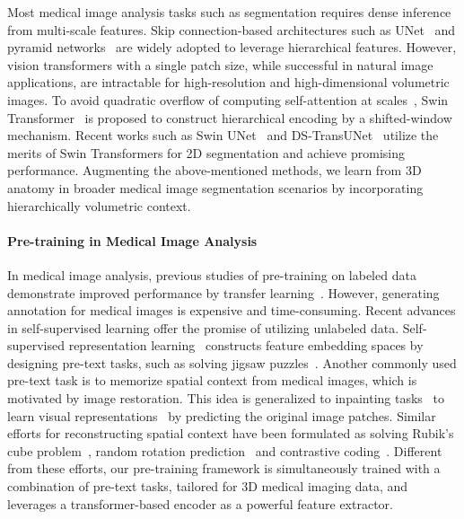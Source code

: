 \documentclass[10pt,twocolumn,letterpaper]{article}
\begin{document}
Most medical image analysis tasks such as segmentation requires dense inference from multi-scale features. Skip connection-based architectures such as UNet~\cite{cciccek20163d} and pyramid networks~\cite{roth2018multi} are widely adopted to leverage hierarchical features. However, vision transformers with a single patch size, while successful in natural image applications, are intractable for high-resolution and high-dimensional volumetric images. To avoid quadratic overflow of computing self-attention at scales~\cite{lin2017feature, singh2018sniper}, Swin Transformer~\cite{liu2021swin,liu2021video} is proposed to construct hierarchical encoding by a shifted-window mechanism. Recent works such as Swin UNet~\cite{cao2021swin} and DS-TransUNet~\cite{lin2021ds} utilize the merits of Swin Transformers for 2D segmentation and achieve promising performance. Augmenting the above-mentioned methods, we learn from 3D anatomy in broader  medical image segmentation scenarios by incorporating hierarchically volumetric context.
\paragraph{Pre-training in Medical Image Analysis}
In medical image analysis, previous studies of pre-training on labeled data demonstrate improved performance by transfer learning~\cite{chen2019med3d, raghu2019transfusion}. However, generating annotation for medical images is expensive and time-consuming. Recent advances in self-supervised learning offer the promise of utilizing unlabeled data. Self-supervised representation learning~\cite{atito2021sit, dai2021up, liang2021swinir} constructs feature embedding spaces by designing pre-text tasks, such as solving jigsaw puzzles~\cite{noroozi2016unsupervised}. Another commonly used pre-text task is to memorize spatial context from medical images, which is motivated by image restoration. This idea is generalized to inpainting tasks~\cite{zhou2021models, haghighi2021transferable, pathak2016context} to learn visual representations~\cite{chen2019self, wang2021self, azizi2021big} by predicting the original image patches. Similar efforts for reconstructing spatial context have been formulated as solving Rubik's cube problem~\cite{zhu2020rubik}, random rotation prediction~\cite{gidaris2018unsupervised, NEURIPS2020_d2dc6368} and contrastive coding~\cite{chen2021empirical,oord2018representation}. Different from these efforts, our pre-training framework is simultaneously trained with a combination of pre-text tasks, tailored for 3D medical imaging data, and leverages a transformer-based encoder as a powerful feature extractor.     
\end{document}
